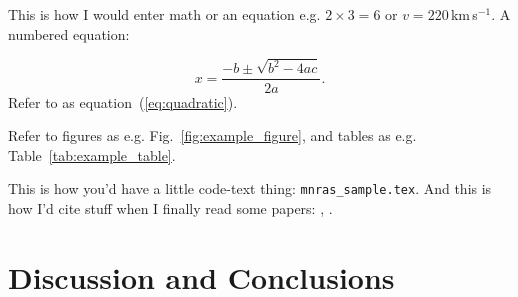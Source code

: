 \documentclass[fleqn,usenatbib]{mnras}
\begin{document}
This is how I would enter math or an equation e.g. $2\times3=6$
or $v=220$\,km\,s$^{-1}$. A numbered equation:

\begin{equation}
    x=\frac{-b\pm\sqrt{b^2-4ac}}{2a}.
	\label{eq:quadratic}
\end{equation}
Refer to as equation~(\ref{eq:quadratic}).

Refer to figures as e.g. Fig.~\ref{fig:example_figure}, and tables as
e.g. Table~\ref{tab:example_table}.

This is how you'd have a little code-text thing: \texttt{mnras\_sample.tex}.
And this is how I'd cite stuff when I finally read some papers: \citet{Others2013}, \citep[e.g.][]{Author2012}.



\section{Discussion and Conclusions}
\end{document}
